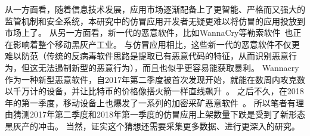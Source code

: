 从一方面看，随着信息技术发展，应用市场逐渐配备上了更智能、严格而又强大的监管机制和安全系统，本研究中的仿冒应用开发者无疑更难以将仿冒的应用投放到市场上了。
从另一方面看，新一代的恶意软件，比如WannaCry等勒索软件~\cite{ransomware}也正在影响着整个移动黑灰产工业。
与仿冒应用相比，这些新一代的恶意软件不仅更难以防范（传统的反病毒软件思路是提取已有恶意代码的特征，从而识别恶意行为，但这无法遏制新型的恶意行为），而且也似乎更容易能获取暴利。
Wannacry作为一种新型恶意软件，自2017年第二季度被首次发现开始，就能在数周内攻克数以千万计的设备，并让比特币的价格像搭火箭一样直线飙升~\cite{wannacry_bitcoin_news}。
之后不久，在2018年的第一季度，移动设备上也爆发了一系列的加密采矿恶意软件~\cite{comodo_report}。
所以笔者有理由猜测2017年第二季度和2018年第一季度的仿冒应用上架数量下跌是受到了新形态黑灰产的冲击。
当然，证实这个猜想还需要采集更多数据、进行更深入的研究。

\vspace{5mm}
\noindent{}

